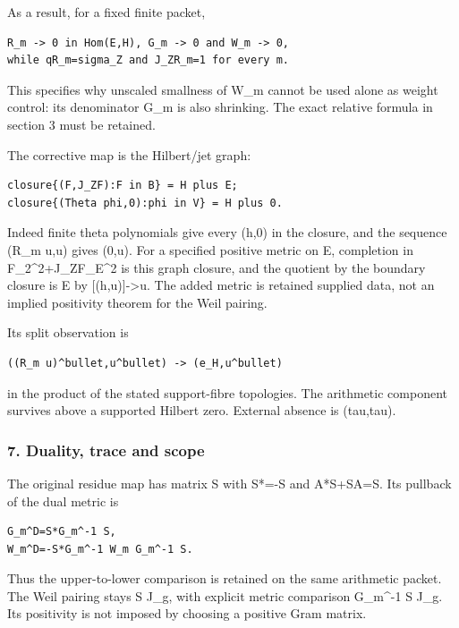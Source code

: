 As a result, for a fixed finite packet,

\begin{verbatim}
R_m -> 0 in Hom(E,H), G_m -> 0 and W_m -> 0,
while qR_m=sigma_Z and J_ZR_m=1 for every m.
\end{verbatim}

This specifies why unscaled smallness of W\_m cannot be used alone as weight control: its
denominator G\_m is also shrinking. The exact relative formula in section 3 must be retained.

The corrective map is the Hilbert/jet graph:

\begin{verbatim}
closure{(F,J_ZF):F in B} = H plus E;
closure{(Theta phi,0):phi in V} = H plus 0.
\end{verbatim}

Indeed finite theta polynomials give every (h,0) in the closure, and the sequence (R\_m u,u) gives
(0,u). For a specified positive metric on E, completion in
\textbar\textbar F\textbar\textbar\_2\^{}2+\textbar\textbar J\_ZF\textbar\textbar\_E\^{}2 is this
graph closure, and the quotient by the boundary closure is E by {[}(h,u){]}\textbar-\textgreater u.
The added metric is retained supplied data, not an implied positivity theorem for the Weil pairing.

Its split observation is

\begin{verbatim}
((R_m u)^bullet,u^bullet) -> (e_H,u^bullet)
\end{verbatim}

in the product of the stated support-fibre topologies. The arithmetic component survives above a
supported Hilbert zero. External absence is (tau,tau).

\subsubsection{7. Duality, trace and scope}\label{pr_13:duality-trace-and-scope}

The original residue map has matrix S with S*=-S and A*S+SA=S. Its pullback of the dual metric is

\begin{verbatim}
G_m^D=S*G_m^-1 S,
W_m^D=-S*G_m^-1 W_m G_m^-1 S.
\end{verbatim}

Thus the upper-to-lower comparison is retained on the same arithmetic packet. The Weil pairing stays
S J\_g, with explicit metric comparison G\_m\^{}-1 S J\_g. Its positivity is not imposed by choosing
a positive Gram matrix.

